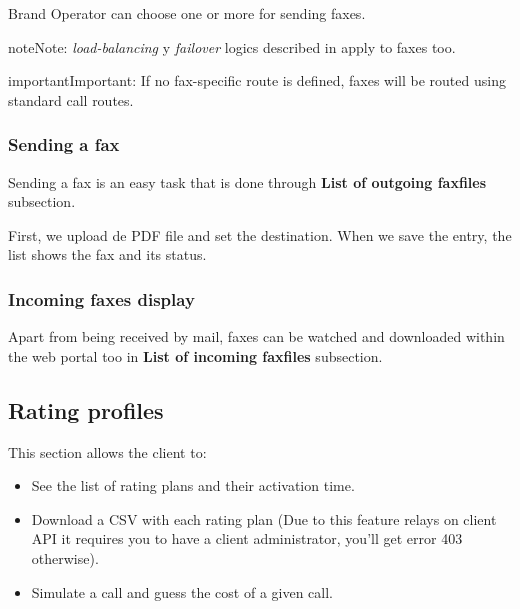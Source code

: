 \documentclass[letterpaper,10pt,english]{sphinxmanual}
\begin{document}
Brand Operator can choose one or more {\hyperref[administration_portal/brand/routing/outgoing_routings:outgoing\string-routings]{}} for sending faxes.

\begin{notice}{note}{Note:}
\emph{load-balancing} y \emph{failover} logics described in {\hyperref[administration_portal/brand/routing/outgoing_routings:outgoing\string-routings]{}}
apply to faxes too.
\end{notice}

\begin{notice}{important}{Important:}
If no fax-specific route is defined, faxes will be routed using
standard call routes.
\end{notice}


\subsubsection{Sending a fax}
\label{administration_portal/client/residential/faxes:sending-a-fax}
Sending a fax is an easy task that is done through \textbf{List of outgoing faxfiles} subsection.

First, we upload de PDF file and set the destination. When we save the entry, the list shows the fax and its status.


\subsubsection{Incoming faxes display}
\label{administration_portal/client/residential/faxes:incoming-faxes-display}
Apart from being received by mail, faxes can be watched and downloaded within
the web portal too in \textbf{List of incoming faxfiles} subsection.


\subsection{Rating profiles}
\label{administration_portal/client/residential/rating_profiles:rating-profiles}\label{administration_portal/client/residential/rating_profiles::doc}
This section allows the client to:
\begin{itemize}
\item {} 
See the list of rating plans and their activation time.

\item {} 
Download a CSV with each rating plan (Due to this feature relays on client API it requires you to have a client administrator, you'll get error 403 otherwise).

\item {} 
Simulate a call and guess the cost of a given call.

\end{itemize}
\end{document}
